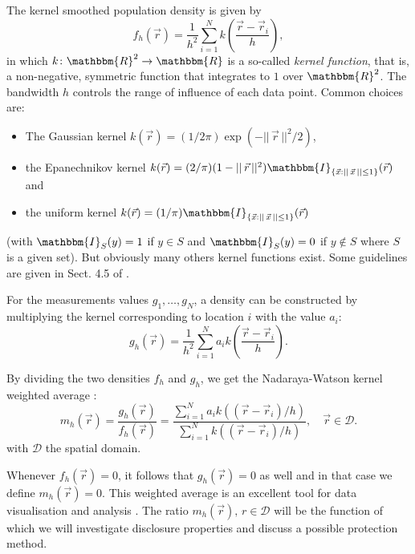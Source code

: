 The kernel smoothed population density is given by 
\[ f_h(\vec{r}) = \frac{1}{h^2} \sum_{i=1}^N k\left(\frac{\vec{r}-\vec{r}_i}{h}\right)  , \]
in which $k\colon\mathbbm{R}^2\rightarrow\mathbbm{R}$ is a so-called \emph{kernel function}, that is, a non-negative, symmetric function that integrates to $1$ over $\mathbbm{R}^2$. The bandwidth $h$ controls the range of influence of each data point. 
Common choices are:
\begin{itemize}
    \item The Gaussian kernel $k(\vec{r}) = (1/2\pi) \exp(-||\,\vec{r}\,||^2/2)$,
    \item the Epanechnikov kernel $k(\vec{r}) = (2/\pi) (1-||\,\vec{r}\,||^2)\mathbbm{I}_{\{\vec{x}:||\,\vec{x}\,||\leq1\}}(\vec{r})$ and
    \item the uniform kernel $k(\vec{r}) = (1/\pi)\mathbbm{I}_{\{\vec{x}:||\,\vec{x}\,||\leq1\}}(\vec{r})$
\end{itemize} (with $\mathbbm{I}_S(y)=1$ if $y\in S$ and $\mathbbm{I}_S(y)=0$ if $y\notin S$ where $S$ is a given set). But obviously many others kernel functions exist. Some guidelines are given in Sect. 4.5 of \cite{Wand1994}.

For the measurements values $g_1,\ldots,g_N$, a density can be constructed by multiplying the kernel corresponding to location $i$ with the value $a_i$:
\[ g_h(\vec{r}) = \frac{1}{h^2} \sum_{i=1}^N a_i k\left(\frac{\vec{r}-\vec{r}_i}{h}\right)  . \]

By dividing the two densities $f_h$ and $g_h$, we get the Nadaraya-Watson kernel weighted average \citep{Watson1964}:
\begin{equation} \label{e:smooth}
m_h(\vec{r}) = \frac{g_h(\vec{r})}{f_h(\vec{r})} = \frac{\sum_{i=1}^N a_i k\left((\vec{r}-\vec{r}_i)/h\right)}{\sum_{i=1}^N k\left((\vec{r}-\vec{r}_i)/h\right)}, \quad \vec{r}\in\mathcal{D}.
\end{equation}
with $\mathcal{D}$ the spatial domain.

Whenever $f_h(\vec{r})=0$, it follows that $g_h(\vec{r})=0$ as well and in that case we define $m_h(\vec{r})=0$. This weighted average is an excellent tool for data visualisation and analysis \citep{Chacon2018}. The ratio $m_h(\vec{r}),\,r\in\mathcal{D}$ will be the function of which we will investigate disclosure properties and discuss a possible protection method.


